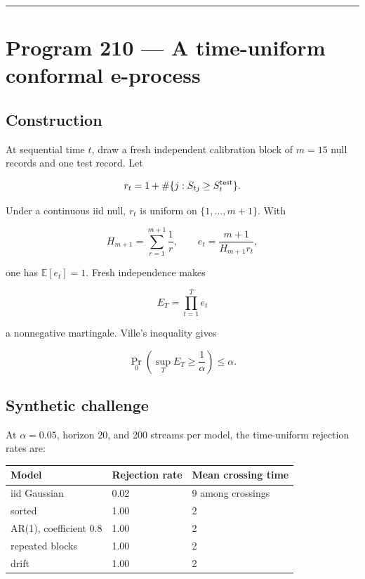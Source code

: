 \documentclass[11pt,a4paper,openany]{report}
\begin{document}
\par\medskip\hrule\medskip

\chapter{Program 210 --- A time-uniform conformal e-process}

\section{Construction}

At sequential time \(t\), draw a fresh independent calibration block of \(m=15\) null records and one test record. Let

\[
r_t=
1+\#\{j:S_{tj}\ge S_t^{\rm test}\}.
\]

Under a continuous iid null, \(r_t\) is uniform on \(\{1,\ldots,m+1\}\). With

\[
H_{m+1}=\sum_{r=1}^{m+1}\frac1r,
\qquad
e_t=\frac{m+1}{H_{m+1}r_t},
\]

one has \(\mathbb E[e_t]=1\). Fresh independence makes

\[
E_T=\prod_{t=1}^Te_t
\]

a nonnegative martingale. Ville's inequality gives

\[
\Pr_0\left(\sup_TE_T\ge\frac1\alpha\right)\le\alpha.
\]

\section{Synthetic challenge}

At \(\alpha=0.05\), horizon \(20\), and 200 streams per model, the time-uniform rejection rates are:

\begin{center}
\begingroup\small
\setlength{\tabcolsep}{3.5pt}
\renewcommand{\arraystretch}{1.16}
\begin{longtable}{@{}p{}p{}p{}@{}}
\toprule
\textbf{Model} & \textbf{Rejection rate} & \textbf{Mean crossing time} \\
\midrule
\endhead
iid Gaussian & 0.02 & 9 among crossings \\
sorted & 1.00 & 2 \\
AR(1), coefficient 0.8 & 1.00 & 2 \\
repeated blocks & 1.00 & 2 \\
drift & 1.00 & 2 \\
\bottomrule
\end{longtable}
\endgroup
\end{center}
\end{document}
